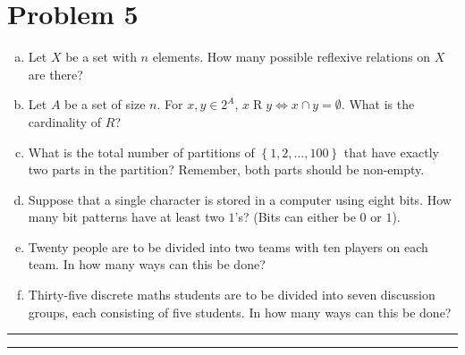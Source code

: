 \documentclass{article}
\theoremstyle{definition}
\newenvironment{solution}{\bigskip\hrule{\hfill}}{\bigskip\hrule{\hfill}} %
\begin{document}
\section*{Problem 5}
\begin{enumerate}[a)] %
    \item Let $X$ be a set with $n$ elements. How many possible reflexive relations on $X$ are there?
    \item Let $A$ be a set of size $n$. For $x,y\in 2^A$, $x\mathrel{R}y\Longleftrightarrow x\cap y=\emptyset$. What is the cardinality of $R$?
    \item What is the total number of partitions of $\left\{1,2,\dots,100\right\}$ that have exactly two parts in the partition? Remember, both parts should be non-empty.
    \item Suppose that a single character is stored in a computer using eight bits. How many bit patterns have at least two $1$'s? (Bits can either be $0$ or $1$).
    \item Twenty people are to be divided into two teams with ten players on each team. In how many ways can this be done?
    \item Thirty-five discrete maths students are to be divided into seven discussion groups, each consisting of five students. In how many ways can this be done?
\end{enumerate}
\begin{solution}


\end{solution}


\newpage

\end{document}
